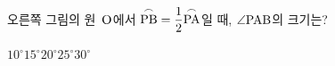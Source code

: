 \noindent\begin{minipage}[t]{0.58\linewidth}\vspace{0pt}\raggedright 오른쪽 그림의 원~$\mathrm{O}$에서 $\overset{\frown}{\mathrm{PB}}=\dfrac{1}{2}\overset{\frown}{\mathrm{PA}}$일 때, $\angle\mathrm{PAB}$의 크기는?\end{minipage}\hfill\begin{minipage}[t]{0.4\linewidth}\vspace{0pt}\centering \resizebox{\ifdim\width>\linewidth\linewidth\else\width\fi}{!}{}\end{minipage}\par
\begin{choicesii}{$10^\circ$}{$15^\circ$}{$20^\circ$}{$25^\circ$}{$30^\circ$}\end{choicesii}
